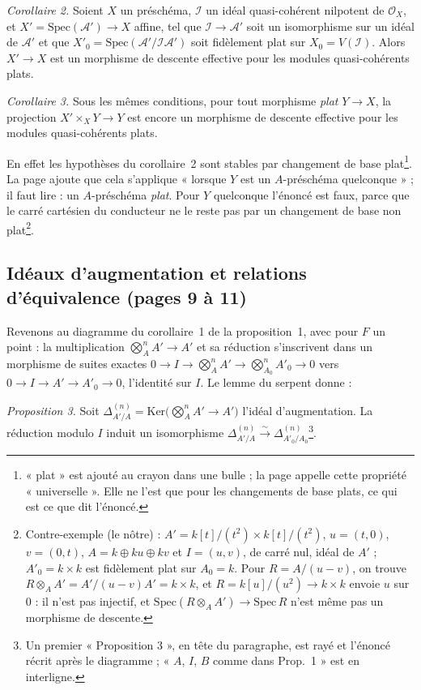 \documentclass[11pt,a4paper]{article}
\begin{document}
\emph{Corollaire 2.} Soient $X$ un préschéma, $\mathcal{I}$ un idéal
quasi-cohérent nilpotent de $\mathcal{O}_X$, et $X' =
\mathrm{Spec}(\mathcal{A}') \to X$ affine, tel que $\mathcal{I} \to
\mathcal{A}'$ soit un isomorphisme sur un idéal de $\mathcal{A}'$ et que
$X'_0 = \mathrm{Spec}(\mathcal{A}'/\mathcal{I}\mathcal{A}')$ soit
fidèlement plat sur $X_0 = V(\mathcal{I})$. Alors $X' \to X$ est un
morphisme de descente effective pour les modules quasi-cohérents plats.

\emph{Corollaire 3.} Sous les mêmes conditions, pour tout morphisme
\emph{plat} $Y \to X$, la projection $X' \times_X Y \to Y$ est encore un
morphisme de descente effective pour les modules quasi-cohérents plats.

En effet les hypothèses du corollaire~2 sont stables par changement de base
plat\footnote{« plat » est ajouté au crayon dans une bulle ; la page appelle
cette propriété « universelle ». Elle ne l'est que pour les changements de base
plats, ce qui est ce que dit l'énoncé.}. La page ajoute que cela s'applique
« lorsque $Y$ est un $A$-préschéma quelconque » ; il faut lire : un
$A$-préschéma \emph{plat}. Pour $Y$ quelconque l'énoncé est faux, parce que
le carré cartésien du conducteur ne le reste pas par un changement de base
non plat\footnote{Contre-exemple (le nôtre) : $A' = k[t]/(t^2) \times
k[t]/(t^2)$, $u = (t, 0)$, $v = (0, t)$, $A = k \oplus ku \oplus kv$ et $I
= (u, v)$, de carré nul, idéal de $A'$ ; $A'_0 = k \times k$ est
fidèlement plat sur $A_0 = k$. Pour $R = A/(u - v)$, on trouve $R \otimes_A
A' = A'/(u - v)A' = k \times k$, et $R = k[u]/(u^2) \to k \times k$ envoie
$u$ sur $0$ : il n'est pas injectif, et $\mathrm{Spec}(R \otimes_A A') \to
\mathrm{Spec}\, R$ n'est même pas un morphisme de descente.}.

\subsection*{Idéaux d'augmentation et relations d'équivalence (pages 9 à 11)}

Revenons au diagramme du corollaire~1 de la proposition~1, avec pour $F$ un
point : la multiplication $\bigotimes^n_A A' \to A'$ et sa réduction
s'inscrivent dans un morphisme de suites exactes $0 \to I \to
\bigotimes^n_A A' \to \bigotimes^n_{A_0} A'_0 \to 0$ vers $0 \to I \to A'
\to A'_0 \to 0$, l'identité sur $I$. Le lemme du serpent donne :

\emph{Proposition 3.} Soit $\Delta^{(n)}_{A'/A} = \mathrm{Ker}\bigl(
\bigotimes^n_A A' \to A'\bigr)$ l'idéal d'augmentation. La réduction modulo
$I$ induit un isomorphisme $\Delta^{(n)}_{A'/A} \xrightarrow{\sim}
\Delta^{(n)}_{A'_0/A_0}$\footnote{Un premier « Proposition 3 », en tête du
paragraphe, est rayé et l'énoncé récrit après le diagramme ; « $A$, $I$, $B$
comme dans Prop.~1 » est en interligne.}.
\end{document}
